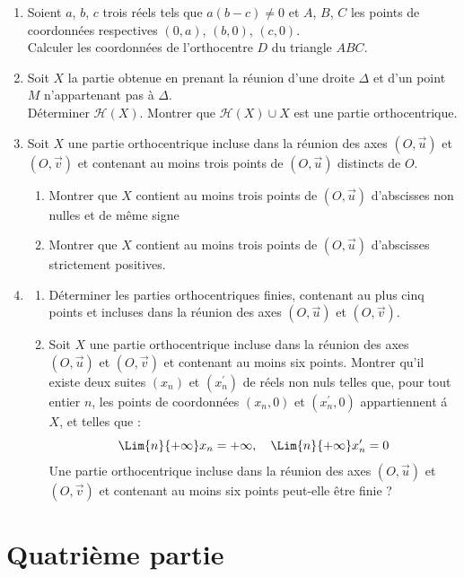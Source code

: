 \documentclass[landscape,twocolumn,leqno,a4paper,10pt]{report} %
\begin{document}
\begin{enumerate}
	\item Soient $a$, $b$, $c$ trois réels tels que $a(b-c) \neq 0$ et $A$, $B$, $C$ les points de coordonnées respectives $(0, a)$, $(b, 0)$, $(c, 0)$.\\
	Calculer les coordonnées de l'orthocentre $D$ du triangle $A B C$.
	\item Soit $X$ la partie obtenue en prenant la réunion d'une droite $\Delta$ et d'un point $M$ n'appartenant pas à $\Delta$.\\
	Déterminer $\mathcal{H}(X)$. Montrer que $\mathcal{H}(X) \cup X$ est une partie orthocentrique.
	\item Soit $X$ une partie orthocentrique incluse dans la réunion des axes $(O, \vec{u})$ et $(O, \vec{v})$ et contenant au moins trois points de $(O, \vec{u})$ distincts de $O$.
	\begin{enumerate}
		\item Montrer que $X$ contient au moins trois points de $(O, \vec{u})$ d'abscisses non nulles et de même signe
		\item Montrer que $X$ contient au moins trois points de $(O, \vec{u})$ d'abscisses strictement positives.
	\end{enumerate}
	\item \begin{enumerate}
		\item Déterminer les parties orthocentriques finies, contenant au plus cinq points et incluses dans la réunion des axes $(O, \vec{u})$ et $(O, \vec{v})$.
		\item Soit $X$ une partie orthocentrique incluse dans la réunion des axes $(O, \vec{u})$ et $(O, \vec{v})$ et contenant au moins six points. Montrer qu'il existe deux suites $\left(x_{n}\right)$ et $\left(x_{n}^{\prime}\right)$ de réels non nuls telles que, pour tout entier $n$, les points de coordonnées $\left(x_{n}, 0\right)$ et $\left(x_{n}^{\prime}, 0\right)$ appartiennent á $X$, et telles que :
		$$\Lim{n}{+\infty} x_{n}=+\infty, \quad \Lim{n}{+\infty} x_{n}^{\prime}=0$$
		Une partie orthocentrique incluse dans la réunion des axes $(O, \vec{u})$ et $(O, \vec{v})$ et contenant au moins six points peut-elle être finie ?
	\end{enumerate}
\end{enumerate}

\newpage

\section{Quatrième partie}
\end{document}
